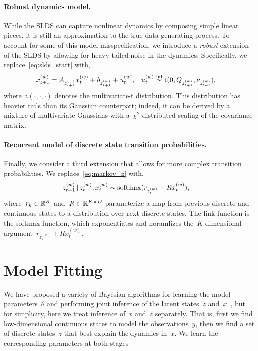 \documentclass{article}
\begin{document}
\paragraph{Robust dynamics model.}  While the SLDS can capture nonlinear
dynamics by composing simple linear pieces, it is still an approximation
to the true data-generating process.  To account for some of this
model misspecification, we introduce a \emph{robust} extension of the
SLDS by allowing for heavy-tailed noise in the dynamics.  Specifically,
we replace~\eqref{eq:slds_start} with,
\begin{align}
  x_{t+1}^{(w)} &= A_{z_{t+1}^{(w)}} x_{t}^{(w)} + b_{z_{t+1}^{(w)}} +  u_t^{(w)},
  &
  u_t^{(w)} &\stackrel{\text{iid}}{\sim} \mathrm{t}(0, Q_{z_{t+1}^{(w)}}, \nu_{z_{t+1}^{(w)}}),
\end{align}
where~$\mathrm{t}(\cdot, \cdot, \cdot)$ denotes the multivariate-t
distribution.  This distribution has heavier tails than its Gaussian
counterpart; indeed, it can be derived by a mixture of multivariate
Gaussians with a~$\chi^2$-distributed scaling of the covariance matrix. 

\paragraph{Recurrent model of discrete state transition probabilities.}
Finally, we consider a third extension that allows for more complex
transition probabilities.  We replace~\eqref{eq:markov_z} with,
\begin{align}
  z_{t+1}^{(w)} \,|\, z_t^{(w)}, x_t^{(w)}
  &\sim \mathrm{softmax}(r_{z_t^{(w)}} + R x_t^{(w)}),
    \label{eq:recurrent}
\end{align}
where~${r_k \in \mathbb{R}^K}$ and~${R \in \mathbb{R}^{K \times D}}$
parameterize a map from previous discrete and continuous states to a
distribution over next discrete states.  The link function is the
softmax function, which exponentiates and noramlizes
the~$K$-dimensional argument~${r_{z_t^{(w)}} + R x_t^{(w)}}$.

\section{Model Fitting}

We have proposed a variety of Bayesian algorithms for learning the
model parameters~$\theta$ and performing joint inference of the
latent states~$z$ and~$x$~\citep{linderman2017recurrent, linderman2017structure},
but for simplicity, here we treat inference of~$x$ and~$z$ separately.
That is, first we find low-dimensional continuous states to model the
observations~$y$, then we find a set of discrete states~$z$ that best
explain the dynamics in~$x$. We learn the corresponding parameters
at both stages.
\end{document}
